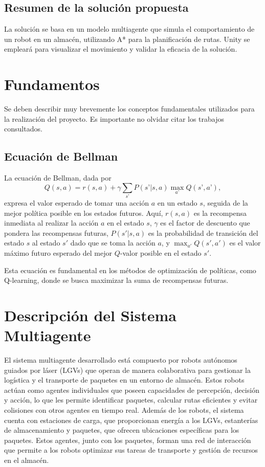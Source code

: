 \documentclass[sjournal]{IEEEtran}
\begin{document}
\subsection{Resumen de la solución propuesta}
La solución se basa en un modelo multiagente que simula el comportamiento de un robot en un almacén, utilizando A* para la planificación de rutas. Unity se empleará para visualizar el movimiento y validar la eficacia de la solución.

\section{Fundamentos}

\noindent
Se deben describir muy brevemente los conceptos fundamentales utilizados para la realización del proyecto. Es importante no olvidar citar los trabajos consultados.

\subsection{Ecuación de Bellman}

La ecuación de Bellman, dada por
\begin{equation}\label{Eq:Bellman}
	Q(s, a) = r(s, a) + \gamma \sum_{s’} P(s’ | s, a) \max_{a’} Q(s’, a’),
\end{equation}
expresa el valor esperado de tomar una acción \(a\) en un estado \(s\), seguida de la mejor política posible en los estados futuros. Aquí, \(r(s, a)\) es la recompensa inmediata al realizar la acción \(a\) en el estado \(s\), \(\gamma\) es el factor de descuento que pondera las recompensas futuras, \(P(s' | s, a)\) es la probabilidad de transición del estado \(s\) al estado \(s'\) dado que se toma la acción \(a\), y \(\max_{a'} Q(s', a')\) es el valor máximo futuro esperado del mejor \(Q\)-valor posible en el estado \(s'\).

Esta ecuación es fundamental en los métodos de optimización de políticas, como Q-learning, donde se busca maximizar la suma de recompensas futuras.


\section{Descripción del Sistema Multiagente}
El sistema multiagente desarrollado está compuesto por robots autónomos guiados por láser (LGVs) que operan de manera colaborativa para gestionar la logística y el transporte de paquetes en un entorno de almacén. Estos robots actúan como agentes individuales que poseen capacidades de percepción, decisión y acción, lo que les permite identificar paquetes, calcular rutas eficientes y evitar colisiones con otros agentes en tiempo real.
Además de los robots, el sistema cuenta con estaciones de carga, que proporcionan energía a los LGVs, estanterías de almacenamiento y paquetes, que ofrecen ubicaciones específicas para los paquetes. Estos agentes, junto con los paquetes, forman una red de interacción que permite a los robots optimizar sus tareas de transporte y gestión de recursos en el almacén. 
\end{document}
